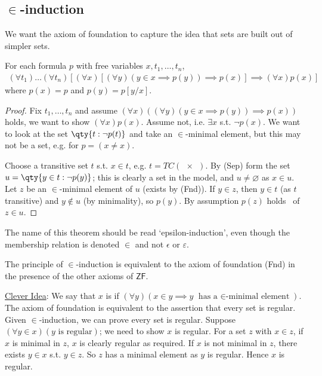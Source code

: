 \subsection{\texorpdfstring{$\in$}{∈}-induction}
We want the axiom of foundation to capture the idea that sets are built out of simpler sets.
\begin{theorem}
    For each formula $p$ with free variables $x, t_1, \dots, t_n$,
    \begin{align*}
        (\forall t_1)\dots(\forall t_n)[(\forall x)[(\forall y)(y \in x \implies p(y)) \implies p(x)] \implies (\forall x)p(x)]
    \end{align*}
    where $p(x) = p$ and $p(y) = p[y/x]$.
\end{theorem}

\begin{proof}
    Fix $t_1, \dots, t_n$ and assume $(\forall x)((\forall y)(y \in x \implies p(y)) \implies p(x))$ holds, we want to show $(\forall x)p(x)$.
    Assume not, i.e. $\exists x$ s.t. $\neg p(x)$.
    We want to look at the set $\qty{t : \neg p(t)}$ and take an $\in$-minimal element, but this may not be a set, e.g. for $p = (x \neq x)$.

    Choose a transitive set $t$ s.t. $x \in t$, e.g. $t = TC(\qty{x})$.
    By (Sep) form the set $u = \qty{y \in t : \neg p(y)}$; this is clearly a set in the model, and $u \neq \varnothing$ as $x \in u$.
    Let $z$ be an $\in$-minimal element of $u$ (exists by (Fnd)).
    If $y \in z$, then $y \in t$ (as $t$ transitive) and $y \notin u$ (by minimality), so $p(y)$.
    By assumption $p(z)$ holds \Lightning\ of $z \in u$.
\end{proof}
The name of this theorem should be read `epsilon-induction', even though the membership relation is denoted $\in$ and not $\epsilon$ or $\varepsilon$.

The principle of $\in$-induction is equivalent to the axiom of foundation (Fnd) in the presence of the other axioms of $\mathsf{ZF}$.

\underline{Clever Idea}: We say that $x$ is  if $(\forall y)(x \in y \implies y \text{ has a $\in$-minimal element})$.
The axiom of foundation is equivalent to the assertion that every set is regular.
Given $\in$-induction, we can prove every set is regular.
Suppose $(\forall y \in x)(y \text{ is regular})$; we need to show $x$ is regular.
For a set $z$ with $x \in z$, if $x$ is minimal in $z$, $x$ is clearly regular as required.
If $x$ is not minimal in $z$, there exists $y \in x$ s.t. $y \in z$.
So $z$ has a minimal element as $y$ is regular.
Hence $x$ is regular.

